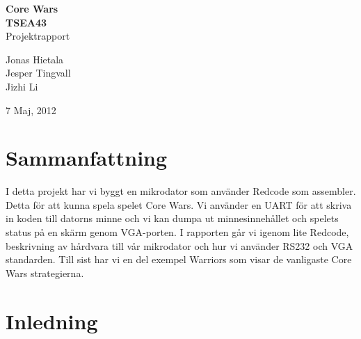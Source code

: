 \documentclass[11pt]{article}
\begin{document}
\begin{titlepage}

\begin{center}


\vspace*{4cm}

{ \huge \bfseries Core Wars}\\[0.2cm]
{ \Large \bfseries TSEA43}\\[0.2cm]
{ Projektrapport}\\[0.2cm]

\vspace*{2cm}

Jonas Hietala \\
Jesper Tingvall \\
Jizhi Li

\vfill

{\large 7 Maj, 2012}

\end{center}

\end{titlepage}
\newpage

\newpage
\thispagestyle{empty}
\mbox{}


\newpage
\section*{Sammanfattning}

I detta projekt har vi byggt en mikrodator som använder Redcode som assembler. Detta för att kunna spela spelet Core Wars. Vi använder en UART för att skriva in koden till datorns minne och vi kan dumpa ut minnesinnehållet och spelets status på en skärm genom VGA-porten. I rapporten går vi igenom lite Redcode, beskrivning av hårdvara till vår mikrodator och hur vi använder RS232 och VGA standarden. Till sist har vi en del exempel Warriors som visar de vanligaste Core Wars strategierna.

\thispagestyle{empty}
\newpage


\tableofcontents

\thispagestyle{empty}
\newpage


\setcounter{page}{1}

\setlength{\parskip}{4mm plus1mm minus3mm}

\section{Inledning}
\end{document}
